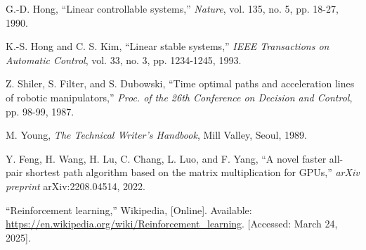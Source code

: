 \documentclass{IJCAS}
\begin{document}
\begin{reference}
 

 G.-D. Hong, ``Linear controllable systems,'' \textit{Nature}, vol. 135, no. 5, pp. 18-27, 1990. 

 K.-S. Hong and C. S. Kim, ``Linear stable systems,'' \textit{IEEE Transactions on Automatic Control}, vol. 33, no. 3, pp. 1234-1245, 1993. 

 Z. Shiler, S. Filter, and S. Dubowski, ``Time optimal paths and acceleration lines of robotic manipulators,'' \textit{Proc. of the 26th Conference on Decision and Control}, pp. 98-99, 1987.

  M. Young, \textit{The Technical Writer's Handbook}, Mill Valley, Seoul, 1989.

  Y. Feng, H. Wang, H. Lu, C. Chang, L. Luo, and F. Yang, ``A novel faster all-pair shortest path algorithm based on the matrix multiplication for GPUs,'' \textit{arXiv preprint} arXiv:2208.04514, 2022.

 ``Reinforcement learning,'' Wikipedia, [Online]. Available: \href{https://en.wikipedia.org/wiki/Reinforcement_learning}{https://en.wikipedia.org/wiki/Reinforcement\_learning}. [Accessed: March 24, 2025].
\end{reference}



\end{document}
